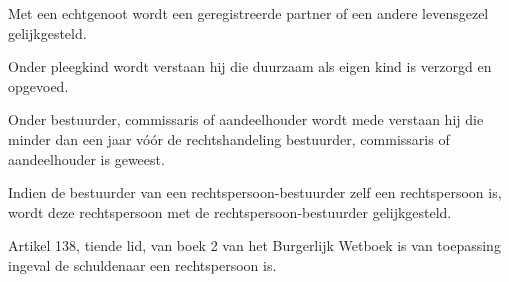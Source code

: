 Met een echtgenoot wordt een geregistreerde partner of een andere
levensgezel gelijkgesteld.






Onder pleegkind wordt verstaan hij die duurzaam als eigen kind is
verzorgd en opgevoed.






Onder bestuurder, commissaris of aandeelhouder wordt mede verstaan hij
die minder dan een jaar vóór de rechtshandeling bestuurder, commissaris
of aandeelhouder is geweest.






Indien de bestuurder van een rechtspersoon-bestuurder zelf een
rechtspersoon is, wordt deze rechtspersoon met de
rechtspersoon-bestuurder gelijkgesteld.






Artikel 138, tiende lid, van boek 2 van het Burgerlijk Wetboek is van
toepassing ingeval de schuldenaar een rechtspersoon is.



